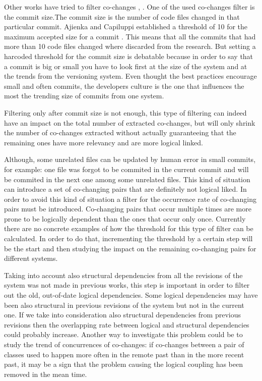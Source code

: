 \documentclass[12pt, a4paper, twoside]{report}
\begin{document}
Other works have tried to filter co-changes \cite{Oliva:2011:ISL:2067853.2068086}, \cite{DBLP:journals/jss/AjienkaC17}. One of the used co-changes filter is the commit size.The commit size is the number of code files changed in that particular commit. 
Ajienka and Capiluppi established a threshold of 10 for the maximum accepted size for a commit \cite{DBLP:journals/jss/AjienkaC17}. This means that all the commits that had more than 10 code files changed where discarded from the research. But setting a harcoded threshold for the commit size is debatable because in order to say that a commit is big or small you have to look first at the size of the system and at the trends from the versioning system. Even thought the best practices encourage small and often commits, the developers culture is the one that influences the most the trending size of commits from one system.

Filtering only after commit size is not enough, this type of filtering can indeed have an impact on the total number of extracted co-changes, but will only shrink the number of co-changes extracted without actually guaranteeing that the remaining ones have more relevancy and are more logical linked.

Although, some unrelated files can be updated by human error in small commits, for example: one file was forgot to be commited in the current commit and will be commited in the next one among some unrelated files. This kind of situation can introduce a set of co-changing pairs that are definitely not logical liked. In order to avoid this kind of situation a filter for the occurrence rate of co-changing pairs must be introduced. Co-changing pairs that occur multiple times are more prone to be logically dependent than the ones that occur only once. Currently there are no concrete examples of how the threshold for this type of filter can be calculated. In order to do that, incrementing the threshold by a certain step will be the start and then studying the impact on the remaining co-changing pairs for different systems. 

Taking into account also structural dependencies from all the revisions of the system was not made in previous works, this step is important in order to filter out the old, out-of-date logical dependencies. Some logical dependencies may have been also structural in previous revisions of the system but not in the current one. If we take into consideration also structural dependencies from previous revisions then the overlapping rate between logical and structural dependencies could probably increase. Another way to investigate this problem could be to study the trend of concurrences of co-changes: if co-changes between a pair of classes used to happen more often in the remote past than in the more recent past, it may be a sign that the problem causing the logical coupling has been removed in the mean time. 
\end{document}
